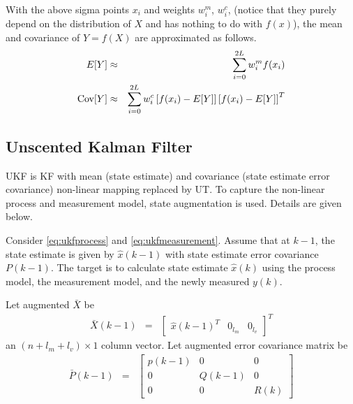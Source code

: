 With the above sigma points $x_i$ and weights $w_i^m$, $w_i^c$, (notice that they purely depend on the distribution of $X$ and has nothing to do with $f(x)$), the mean and covariance of $Y=f(X)$ are approximated as follows.
\begin{eqnarray}
	E[Y] &\approx& \sum_{i=0}^{2L} w_i^m f(x_i) \nonumber \\
	\textup{Cov}[Y] &\approx& \sum_{i=0}^{2L} w_i^c \left[f(x_i) - E[Y]\right]\left[f(x_i) - E[Y]\right]^T \nonumber
\end{eqnarray}

\subsection{Unscented Kalman Filter}

UKF is KF with mean (state estimate) and covariance (state estimate error covariance) non-linear mapping replaced by UT. To capture the non-linear process and measurement model, state augmentation is used. Details are given below.

Consider \eqref{eq:ukfprocess} and \eqref{eq:ukfmeasurement}. Assume that at $k-1$, the state estimate is given by $\hat{x}(k-1)$ with state estimate error covariance $P(k-1)$. The target is to calculate state estimate $\hat{x}(k)$ using the process model, the measurement model, and the newly measured $y(k)$. 

Let augmented $\bar{X}$ be
\begin{eqnarray}
	\bar{X}(k-1) &=& \left[\begin{array}{ccc}
		\hat{x}(k-1)^T & 0_{l_m} & 0_{l_v}
	\end{array}\right]^T \label{eq:ukfstateaugment}
\end{eqnarray}
an $(n+l_m+l_v)\times 1$ column vector. Let augmented error covariance matrix be
\begin{eqnarray}
	\bar{P}(k-1) &=& \left[\begin{array}{ccc}
		p(k-1) & 0 & 0 \\
		0 & Q(k-1) & 0 \\
		0 & 0 & R(k)
	\end{array}\right] \label{eq:ukfcovaugment}
\end{eqnarray}

